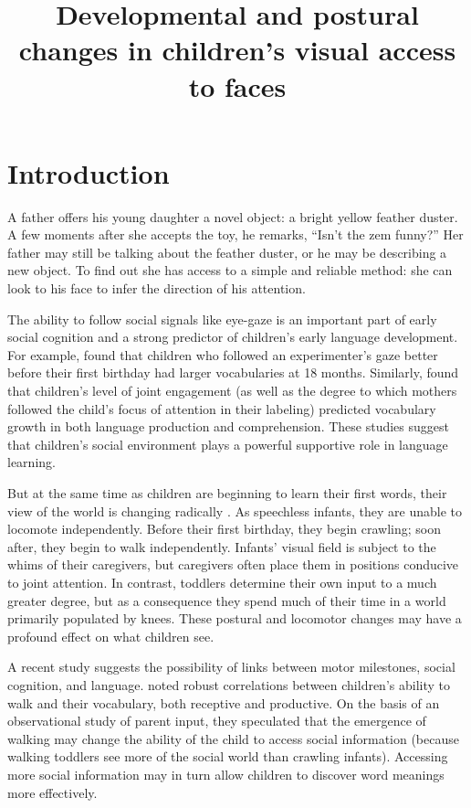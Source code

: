 \documentclass[man,noapacite]{apa2}
\title{Developmental and postural changes in children's visual access to faces}
\begin{document}
\maketitle

\section{Introduction}

A father offers his young daughter a novel object: a bright yellow feather duster. A few moments after she accepts the toy, he remarks, ``Isn't the zem funny?'' Her father may still be talking about the feather duster, or he may be describing a new object.  To find out she has access to a simple and reliable method: she can look to his face to infer the direction of his attention. 

The ability to follow social signals like eye-gaze is an important part of early social cognition \cite{scaife1975} and a strong predictor of children's early language development. For example,  found that children who followed an experimenter's gaze better before their first birthday had larger vocabularies at 18 months. Similarly,  found that children's level of joint engagement (as well as the degree to which mothers followed the child's focus of attention in their labeling) predicted vocabulary growth in both language production and comprehension. These studies suggest that children's social environment plays a powerful supportive role in language learning. 

But at the same time as children are beginning to learn their first words, their view of the world is changing radically \cite{adolph2007}. As speechless infants, they are unable to locomote independently. Before their first birthday, they begin crawling; soon after, they begin to walk independently. Infants' visual field is subject to the whims of their caregivers, but caregivers often place them in positions conducive to joint attention. In contrast, toddlers determine their own input to a much greater degree, but as a consequence they spend much of their time in a world primarily populated by knees. These postural and locomotor changes may have a profound effect on what children see.

A recent study suggests the possibility of links between motor milestones, social cognition, and language.  noted robust correlations between children's ability to walk and their vocabulary, both receptive and productive. On the basis of an observational study of parent input, they speculated that the emergence of walking may change the ability of the child to access social information (because walking toddlers see more of the social world than crawling infants). Accessing more social information may in turn allow children to discover word meanings more effectively.
\end{document}
